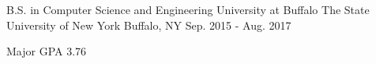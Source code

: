 

\begin{cventries}

  \cventry
    {B.S. in Computer Science and Engineering} %
    {University at Buffalo The State University of New York} %
    {Buffalo, NY} %
    {Sep. 2015 - Aug. 2017} %
    {
      \begin{cvitems} %
        \item {Major GPA 3.76}
      \end{cvitems}
    }

\end{cventries}
